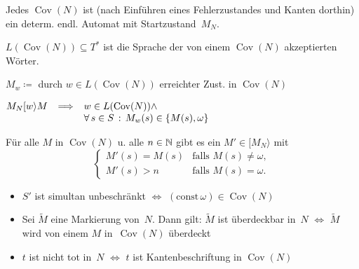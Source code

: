 \documentclass{cheat-sheet}
\newcommand{\activeTransition}[1]{[{#1}\rangle} %
\DeclareMathOperator{\Cov}{Cov} %
\begin{document}
\begin{bem}
  Jedes $\Cov(N)$ ist (nach Einführen eines Fehlerzustandes und Kanten dorthin) ein determ. endl. Automat mit Startzustand~$M_N$.
\end{bem}

\begin{defn}
  $L(\Cov(N)) \subseteq T^*$ ist die Sprache der von einem $\Cov(N)$ akzeptierten Wörter. 
\end{defn}

\begin{nota}
  $M_w \coloneqq $ durch $w \in L(\Cov(N))$ erreichter Zust. in $\Cov(N)$
\end{nota}

\begin{lem}
  $
    M_N \activeTransition{w} M \enspace \implies
    \begin{array}[t]{l}
      w \in L(\Cov(N)) \wedge \\
      \fa{s \in S} M_w(s) \in \{ M(s), \omega \}
    \end{array}
  $
\end{lem}

\begin{lem}
  Für alle $M$ in $\Cov(N)$ u. alle $n \in \mathbb{N}$ gibt es ein $M' \!\in\! \activeTransition{M_N}$ mit
  \[
    \begin{cases}
      M'(s) = M(s) & \text{falls } M(s) \neq \omega, \\
      M'(s) > n & \text{falls } M(s) = \omega.
    \end{cases}
  \]
\end{lem}

\begin{kor}
  \begin{itemize}
    \item $S'$ ist simultan unbeschränkt $\iff$ $(\mathrm{const} \, \omega) \in \Cov(N)$
    \item Sei $\tilde{M}$ eine Markierung von~$N$. Dann gilt: $\tilde{M}$ ist überdeckbar in~$N$ $\iff$ $\tilde{M}$ wird von einem $M$ in~$\Cov(N)$ überdeckt
    \item $t$ ist nicht tot in~$N$ $\iff$ $t$ ist Kantenbeschriftung in $\Cov(N)$
  \end{itemize}
\end{kor}
\end{document}
